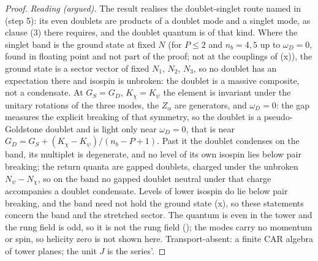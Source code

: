 \begin{proof}
\emph{Reading (argued).} The result realises the doublet-singlet route named in  (step 5): its even doublets are products of a doublet mode and a singlet mode, as clause (3) there requires, and the doublet quantum is of that kind. Where the singlet band is the ground state at fixed $N$ (for $P \le 2$ and $n_{b} = 4, 5$ up to $\omega_{D} = 0$, found in floating point and not part of the proof; not at the couplings of (x)), the ground state is a sector vector of fixed $N_{1}$, $N_{2}$, $N_{3}$, so no doublet has an expectation there and isospin is unbroken: the doublet is a massive composite, not a condensate. At $G_{S} = G_{D}$, $K_{\chi} = K_{\psi}$ the element is invariant under the unitary rotations of the three modes, the $Z_{\alpha}$ are generators, and $\omega_{D} = 0$: the gap measures the explicit breaking of that symmetry, so the doublet is a pseudo-Goldstone doublet and is light only near $\omega_{D} = 0$, that is near $G_{D} = G_{S} + (K_{\chi} - K_{\psi})/(n_{b} - P + 1)$. Past it the doublet condenses on the band, its multiplet is degenerate, and no level of its own isospin lies below pair breaking; the return quanta are gapped doublets, charged under the unbroken $N_{\psi} - N_{\chi}$, so on the band no gapped doublet neutral under that charge accompanies a doublet condensate. Levels of lower isospin do lie below pair breaking, and the band need not hold the ground state (x), so these statements concern the band and the stretched sector. The quantum is even in the tower and the rung field is odd, so it is not the rung field (); the modes carry no momentum or spin, so helicity zero is not shown here. Transport-absent: a finite CAR algebra of tower planes; the unit $J$ is the series'.
\end{proof}

